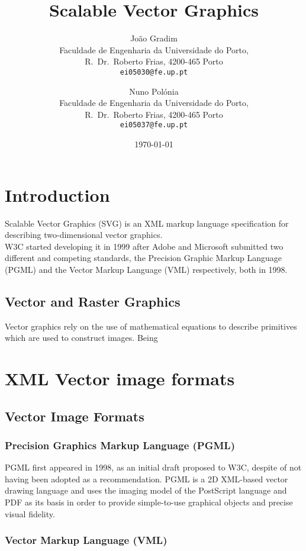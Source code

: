 \documentclass[twocolumn,twoside,10pt,a4paper]{article}
\title{Scalable Vector Graphics}
\author{João Gradim\\
\small Faculdade de Engenharia da Universidade do Porto,\\[-0.8ex]
\small R.\ Dr.\ Roberto Frias, 4200-465 Porto\\[-0.8ex]
\small \texttt{ei05030@fe.up.pt}\\
\and
Nuno Polónia\\
\small Faculdade de Engenharia da Universidade do Porto,\\[-0.8ex]
\small R.\ Dr.\ Roberto Frias, 4200-465 Porto\\[-0.8ex]
\small \texttt{ei05037@fe.up.pt}
}
\date{\today}
\begin{document}
\maketitle
\thispagestyle{plain}

\begin{abstract}
\end{abstract}

\section{Introduction}\label{sec:intro}
Scalable Vector Graphics (SVG) is an XML markup language specification for describing two-dimensional vector graphics.\\
W3C started developing it in 1999 after Adobe and Microsoft submitted two different and competing standards, the Precision Graphic Markup Language (PGML) and the Vector Markup Language (VML) respectively, both in 1998.\\


\subsection{Vector and Raster Graphics}
Vector graphics rely on the use of mathematical equations to describe primitives which are used to construct images. Being 


\section{XML Vector image formats}
\subsection{Vector Image Formats}

\subsubsection{Precision Graphics Markup Language (PGML)}

PGML first appeared in 1998, as an initial draft proposed to W3C, despite of not having been adopted as a recommendation\cite{w3c:pgml}. PGML is a 2D XML-based vector drawing language and uses the imaging model of the PostScript language and PDF as its basis in order to provide simple-to-use graphical objects and precise visual fidelity.

\subsubsection{Vector Markup Language (VML)}
\end{document}
